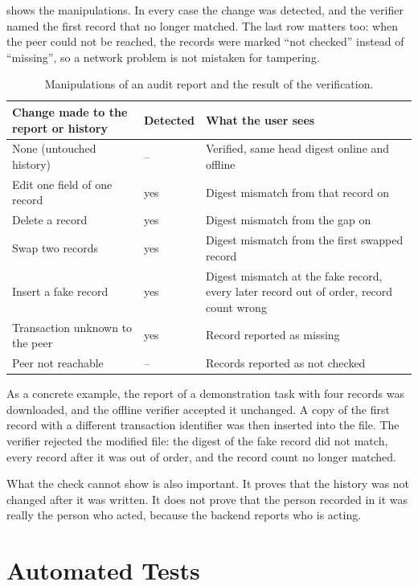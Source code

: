  shows the manipulations. In every case the change was detected, and the verifier named the first record that no longer matched. The last row matters too: when the peer could not be reached, the records were marked ``not checked'' instead of ``missing'', so a network problem is not mistaken for tampering.

\begin{table}[htbp]
    \centering
    \small
    \begin{tabular}{p{4.6cm}p{2.0cm}p{5.0cm}}
        \toprule
        Change made to the report or history & Detected & What the user sees \\
        \midrule
        None (untouched history) & -- & Verified, same head digest online and offline \\
        Edit one field of one record & yes & Digest mismatch from that record on \\
        Delete a record & yes & Digest mismatch from the gap on \\
        Swap two records & yes & Digest mismatch from the first swapped record \\
        Insert a fake record & yes & Digest mismatch at the fake record, every later record out of order, record count wrong \\
        Transaction unknown to the peer & yes & Record reported as missing \\
        Peer not reachable & -- & Records reported as not checked \\
        \bottomrule
    \end{tabular}
    \caption{Manipulations of an audit report and the result of the verification.}
    \label{tab:tamper}
\end{table}

As a concrete example, the report of a demonstration task with four records was downloaded, and the offline verifier accepted it unchanged. A copy of the first record with a different transaction identifier was then inserted into the file. The verifier rejected the modified file: the digest of the fake record did not match, every record after it was out of order, and the record count no longer matched.

What the check cannot show is also important. It proves that the history was not changed after it was written. It does not prove that the person recorded in it was really the person who acted, because the backend reports who is acting.

\section{Automated Tests}
\label{sec:results-tests}

